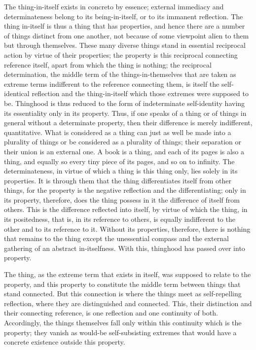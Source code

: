 The thing-in-itself exists in concreto by essence;
external immediacy and determinateness
belong to its being-in-itself,
or to its immanent reflection.
The thing in-itself is thus a thing that has properties,
and hence there are a number of things distinct from one another,
not because of some viewpoint alien to them but through themselves.
These many diverse things stand in essential reciprocal action
by virtue of their properties;
the property is this reciprocal connecting reference itself,
apart from which the thing is nothing;
the reciprocal determination,
the middle term of the things-in-themselves
that are taken as extreme terms
indifferent to the reference connecting them,
is itself the self-identical reflection
and the thing-in-itself
which those extremes were supposed to be.
Thinghood is thus reduced to the
form of indeterminate self-identity
having its essentiality only in its property.
Thus, if one speaks of a thing
or of things in general without a determinate property,
then their difference is merely indifferent, quantitative.
What is considered as a thing can just as well be made into
a plurality of things or be considered as a plurality of things;
their separation or their union is an external one.
A book is a thing, and each of its pages is also a thing,
and equally so every tiny piece of its pages,
and so on to infinity.
The determinateness, in virtue of which
a thing is this thing only,
lies solely in its properties.
It is through them that the thing
differentiates itself from other things,
for the property is the negative reflection
and the differentiating;
only in its property, therefore, does the thing possess
in it the difference of itself from others.
This is the difference reflected into itself,
by virtue of which the thing, in its positedness,
that is, in its reference to others,
is equally indifferent to the other
and to its reference to it.
Without its properties, therefore,
there is nothing that remains to the thing
except the unessential compass
and the external gathering of an abstract in-itselfness.
With this, thinghood has passed over into property.

The thing, as the extreme term that exists in itself,
was supposed to relate to the property,
and this property to constitute the middle term
between things that stand connected.
But this connection is where the things meet
as self-repelling reflection,
where they are distinguished and connected.
This, their distinction and their connecting reference,
is one reflection and one continuity of both.
Accordingly, the things themselves fall only
within this continuity which is the property;
they vanish as would-be self-subsisting extremes
that would have a concrete existence outside this property.

